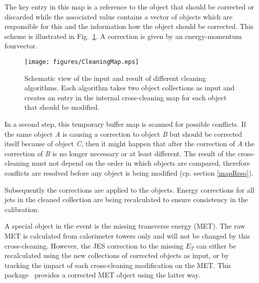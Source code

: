 \documentclass{cmspaper}
\begin{document}
The key entry in this map is a reference to the object that should be corrected
or discarded while the associated value contains a vector of objects which are
responsible for this and the information how the object should be corrected. This
scheme is illustrated in Fig.~\ref{fig:Cleaning}. A correction is given by an
energy-momentum fourvector.

\begin{figure}[hbt]
\begin{center}
\texttt{[image: figures/CleaningMap.eps]}
\caption{Schematic view of the input and result of different cleaning
    algorithms. Each algorithm takes two object collections as input and
    creates an entry in the internal cross-cleaning map for each object
    that should be modified.}
\label{fig:Cleaning}
\end{center}
\end{figure}

In a second step, this temporary buffer map is scanned for possible conflicts.
If the same object {\it A} is causing a correction to object {\it B} but should
be corrected itself because of object {\it C}, then it might happen that after
the correction of {\it A} the correction of {\it B} is no longer necessary or at
least different.
The result of the cross-cleaning must not depend on the order in which objects
are compared, therefore conflicts are resolved before any object is being
modified (cp. section \ref{mapReso}).

Subsequently the corrections are applied to the objects. Energy corrections for
all jets in the cleaned collection are being recalculated to ensure consistency
in the calibration.

A special object in the event is the missing transverse energy (MET). The raw
MET is calculated from calorimeter towers only and will not be changed by this
cross-cleaning. However, the JES correction to the missing $E_T$ can either be
recalculated using the new collections of corrected objects as input, or by
tracking the impact of each cross-cleaning modification on the MET. This
package~\cite{package} provides a corrected MET object using the latter way.
\end{document}
